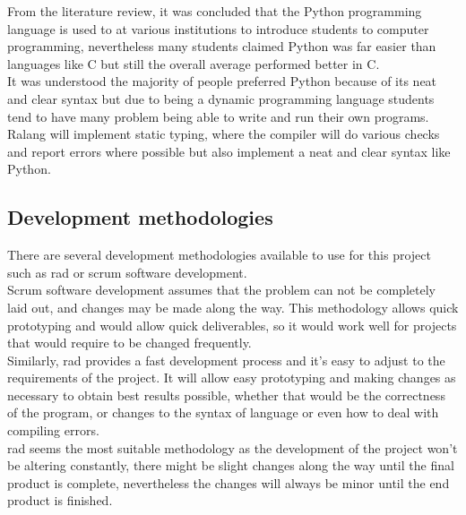 \documentclass[a4paper]{article}
\begin{document}
\begin{appendices}
	From the literature review, it was concluded that the Python programming language is used to at various institutions to introduce students to computer programming, nevertheless many students claimed Python was far easier than languages like C but still the overall average performed better in C. \parencite{KrpanBilobrk2011}\\
	
	It was understood the majority of people preferred Python because of its neat and clear syntax but due to being a dynamic programming language students tend to have many problem being able to write and run their own programs.  Ralang will implement static typing, where the compiler will do various checks and report errors where possible but also implement a neat and clear syntax like Python.
	
	\subsection{Development methodologies}
	\label{App:DevelopmentMethodology}
	There are several development methodologies available to use for this project such as \ac{rad} or scrum software development.\\
	
	Scrum software development assumes that the problem can not be completely laid out, and changes may be made along the way. This methodology allows quick prototyping and would allow quick deliverables, so it would work well for projects that would require to be changed frequently.\\
	
	Similarly, \ac{rad} provides a fast development process and it's easy to adjust to the requirements of the project. It will allow easy prototyping and making changes as necessary to obtain best results possible, whether that would be the correctness of the program, or changes to the syntax of language or even how to deal with compiling errors.\\
	
	\ac{rad} seems the most suitable methodology as the development of the project won't be altering constantly, there might be slight changes along the way until the final product is complete, nevertheless the changes will always be minor until the end product is finished.
	\newpage

\end{appendices}
\end{document}
